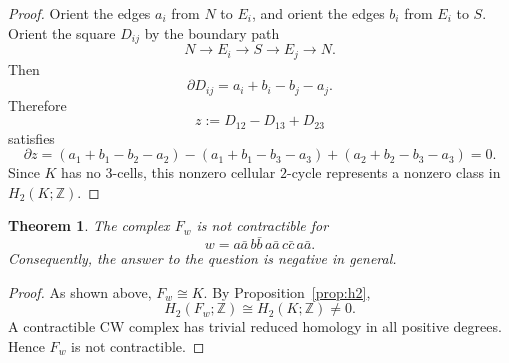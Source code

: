 \documentclass[12pt]{article}
\newtheorem{theorem}{Theorem}
\begin{document}
\begin{proof}
Orient the edges \(a_i\) from \(N\) to \(E_i\), and orient the edges \(b_i\) from \(E_i\) to \(S\).  Orient the square \(D_{ij}\) by the boundary path
\[
N\longrightarrow E_i\longrightarrow S\longrightarrow E_j\longrightarrow N.
\]
Then
\[
\partial D_{ij}=a_i+b_i-b_j-a_j.
\]
Therefore
\[
z:=D_{12}-D_{13}+D_{23}
\]
satisfies
\[
\partial z
=
(a_1+b_1-b_2-a_2)
-(a_1+b_1-b_3-a_3)
+(a_2+b_2-b_3-a_3)
=0.
\]
Since \(K\) has no \(3\)-cells, this nonzero cellular \(2\)-cycle represents a nonzero class in \(H_2(K;\mathbb Z)\).
\end{proof}

\begin{theorem}
The complex \(F_w\) is not contractible for
\[
w=a\bar a\, b\bar b\, a\bar a\, c\bar c\, a\bar a.
\]
Consequently, the answer to the question is negative in general.
\end{theorem}

\begin{proof}
As shown above, \(F_w\cong K\).  By Proposition~\ref{prop:h2},
\[
H_2(F_w;\mathbb Z)\cong H_2(K;\mathbb Z)\neq 0.
\]
A contractible CW complex has trivial reduced homology in all positive degrees.  Hence \(F_w\) is not contractible.
\end{proof}
\end{document}
